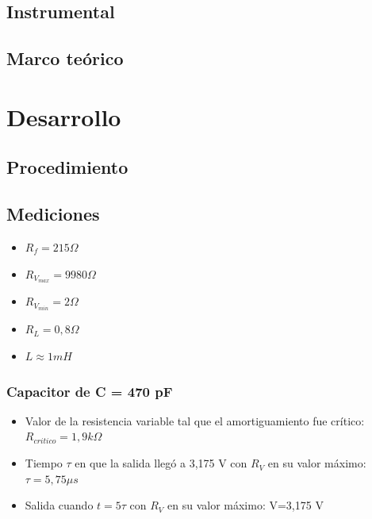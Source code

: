 \documentclass{article}
\begin{document}
    \subsection{Instrumental}
    \subsection{Marco teórico}

\section{Desarrollo}
    \subsection{Procedimiento}
    \subsection{Mediciones}
 
        \begin{itemize}
            \item $ R_f = 215 \Omega $
            \item $ R_{V_{max}} = 9980 \Omega $
            \item $ R_{V_{min}} = 2 \Omega $
            \item $ R_L = 0,8 \Omega $
            \item $ L \approx 1 mH $
        \end{itemize}
        
        \par
        \subsubsection*{Capacitor de C = 470 pF}
            \begin{itemize}
                \item Valor de la resistencia variable tal que el amortiguamiento fue crítico: $ R_{critico} = 1,9 k\Omega $ %
                \item Tiempo $\tau$ en que la salida llegó a 3,175 V con $ R_V $ en su valor máximo: $ \tau = 5,75 \mu s$ %
                \item Salida cuando $t=5\tau$ con $ R_V $ en su valor máximo: V=3,175 V %
            \end{itemize}

        \par
\end{document}
